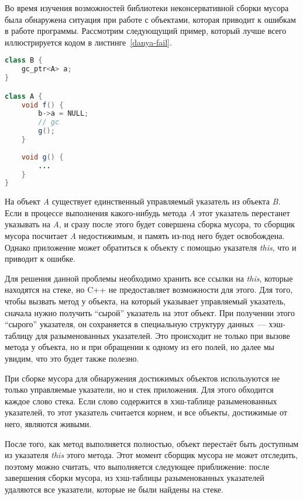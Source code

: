 Во время изучения возможностей библиотеки неконсервативной сборки мусора была обнаружена ситуация при работе с объектами, которая приводит к ошибкам в работе программы. Рассмотрим следующущий пример, который лучше всего иллюстрируется кодом в листинге~\ref{danya-fail}.

\begin{lstlisting}[caption = Пример ошибки\label{danya-fail},language=Java]
class B {
    gc_ptr<A> a;
}

class A {
    void f() {
        b->a = NULL;
        // gc
        g();
    }
    
    void g() {
        ...
    }
}
\end{lstlisting}


На объект \textit{A} существует единственный управляемый указатель из объекта \textit{B}. Если в процессе выполнения какого-нибудь метода \textit{A} этот указатель перестанет указывать на \textit{A}, и сразу после этого будет совершена
сборка мусора, то сборщик мусора посчитает \textit{A} недостижимым, и память из-под него
будет освобождена. Однако приложение может обратиться к объекту с помощью
указателя \textit{this}, что и приводит к ошибке.

Для решения данной проблемы необходимо хранить все ссылки на \textit{this},
которые находятся на стеке, но C++ не предоставляет возможности для этого. 
Для того, чтобы вызвать метод у объекта, на который
указывает управляемый указатель, сначала нужно получить ``сырой'' указатель на этот
объект. При получении этого ``сырого'' указателя, он сохраняется в специальную структуру данных~--- хэш-таблицу для разыменованных указателей.
Это происходит не только при вызове метода у объекта, но и при обращении к одному из
его полей, но далее мы увидим, что это будет также полезно.

При сборке мусора для обнаружения достижимых объектов используются не только 
управляемые указатели, но и стек приложения. Для этого обходится каждое слово стека.
Если слово содержится в хэш-таблице разыменованных указателей, то этот указатель считается корнем, и все объекты, достижимые от него, являются живыми.

После того, как метод выполняется полностью, объект перестаёт быть доступным из
указателя \textit{this} этого метода. Этот момент сборщик мусора не может отследить,
поэтому можно считать, что выполняется следующее приближение: после завершения сборки мусора, из
хэш-таблицы разыменованных указателей удаляются все указатели, которые не были найдены на стеке.


